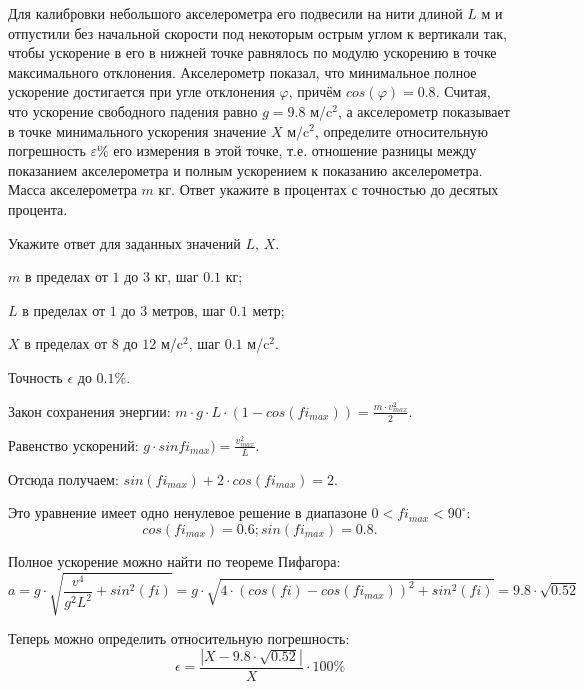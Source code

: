 
Для калибровки небольшого акселерометра его подвесили на нити длиной $L$ м и отпустили без начальной
скорости под некоторым острым углом к вертикали так, чтобы ускорение в его в
нижней точке равнялось по модулю ускорению в точке максимального отклонения.
Акселерометр показал, что минимальное полное ускорение достигается при угле
отклонения $\varphi$, причём $cos(\varphi) = 0.8$. Считая, что
ускорение свободного падения равно $g = 9.8$  м/c$^2$, а акселерометр показывает в точке минимального
ускорения значение $X$  м/c$^2$, определите относительную
погрешность $\varepsilon\%$  его измерения в этой
точке, т.е. отношение разницы между показанием акселерометра и 
полным ускорением к показанию акселерометра. Масса акселерометра $m$  кг. Ответ укажите в процентах с точностью до десятых
процента.

Укажите ответ для заданных значений $L$, $X$.

\paramSection

$m$ в пределах от $1$ до $3$ кг, шаг $0.1$ кг;  

$L$ в пределах от $1$ до $3$ метров, шаг $0.1$ метр;

$X$ в пределах от $8$ до $12$ м/c$^2$,  шаг $0.1$ м/c$^2$. 

Точность $\epsilon$ до $0.1 \%$.

\solutionSection

Закон сохранения энергии: $m \cdot g \cdot L \cdot (1-cos(fi_{max} ) )=\frac{m \cdot v_{max}^2}{2}.$

Равенство ускорений: $g \cdot sinfi_{max})=\frac{v_{max}^2}{L}.$

Отсюда получаем: $sin(fi_{max})+2 \cdot cos(fi_{max} )=2.$

Это уравнение имеет одно ненулевое решение в диапазоне $0 < fi_{max} < 90^{\circ}$:
 $$cos(fi_{max})=0.6;  sin(fi_{max} )=0.8.$$

Полное ускорение можно найти по теореме Пифагора:
$$a=g \cdot \sqrt{\frac{v^4}{g^2 L^2} +sin^2(fi)}=g \cdot \sqrt{4 \cdot (cos(fi)-cos(fi_{max}))^2+sin^2(fi)}= 9.8 \cdot \sqrt{0.52}$$

Теперь можно определить относительную погрешность:
$$\epsilon =\frac{|X-9.8 \cdot \sqrt{0.52}|}{X} \cdot 100 \% $$


